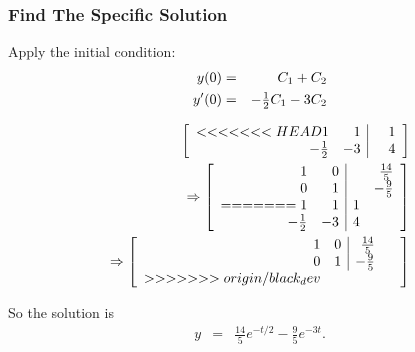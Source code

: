 \begin{frame}
  \frametitle{Find The Specific Solution}

  Apply the initial condition:
  \begin{eqnarray*}
    y(0) & = & C_1 + C_2 \\
    y'(0) & = & -\mbox{$\frac{1}{2}$} C_1 - 3 C_2
  \end{eqnarray*}

  \begin{eqnarray*}
    \left[ \begin{array}{rr|rr}
<<<<<<< HEAD
    1 & 1 &  & 1 \\ 
    -\mbox{$\frac{1}{2}$} & -3 &  & 4 \\ 
    \end{array} \right] \\
    \Rightarrow
    \left[ \begin{array}{rr|rr}
    1 & 0 &  & \frac{14}{5} \\ 
    0 & 1 &  & -\frac{9}{5} \\ 
=======
    1 & 1 & 1 & ~ \\ 
    -\mbox{$\frac{1}{2}$} & -3 & 4 & ~ \\ 
    \end{array} \right] \\
    \Rightarrow
    \left[ \begin{array}{rr|rr}
    1 & 0 & \frac{14}{5} & ~ \\ 
    0 & 1 & -\frac{9}{5} & ~ \\ 
>>>>>>> origin/black_dev
    \end{array} \right]
  \end{eqnarray*}

  So the solution is
  \begin{eqnarray*}
    y & = & \frac{14}{5} e^{-t/2} - \frac{9}{5} e^{-3t}.
  \end{eqnarray*}
  

\end{frame}



